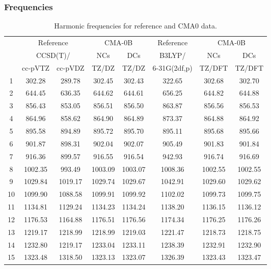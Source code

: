 \documentclass[10pt,oneside]{article}
\begin{document}
\clearpage

\subsubsection*{Frequencies}
\begin{table}[h!]
\centering
\caption{Harmonic frequencies for reference and CMA0 data.}
\begin{tabular}{cccccccc}
\toprule
{} & \multicolumn{2}{c}{Reference} & \multicolumn{2}{c}{CMA-0B} &    Reference & \multicolumn{2}{c}{CMA-0B} \\
{} & \multicolumn{2}{c}{CCSD(T)/} &     NCs &     DCs &       B3LYP/ &     NCs &     DCs \\
{} &   cc-pVTZ & cc-pVDZ &   TZ/DZ &   TZ/DZ & 6-31G(2df,p) &  TZ/DFT &  TZ/DFT \\
\midrule
1  &    302.28 &  289.78 &  302.45 &  302.43 &       322.65 &  302.68 &  302.70 \\
2  &    644.45 &  636.35 &  644.62 &  644.61 &       656.25 &  644.82 &  644.88 \\
3  &    856.43 &  853.05 &  856.51 &  856.50 &       863.87 &  856.56 &  856.53 \\
4  &    864.96 &  858.62 &  864.90 &  864.89 &       873.37 &  864.88 &  864.92 \\
5  &    895.58 &  894.89 &  895.72 &  895.70 &       895.11 &  895.68 &  895.66 \\
6  &    901.87 &  898.31 &  902.04 &  902.07 &       905.49 &  901.83 &  901.84 \\
7  &    916.36 &  899.57 &  916.55 &  916.54 &       942.93 &  916.74 &  916.69 \\
8  &   1002.35 &  993.49 & 1003.09 & 1003.07 &      1008.36 & 1002.55 & 1002.55 \\
9  &   1029.84 & 1019.17 & 1029.74 & 1029.67 &      1042.91 & 1029.60 & 1029.62 \\
10 &   1099.90 & 1088.58 & 1099.91 & 1099.92 &      1102.02 & 1099.73 & 1099.75 \\
11 &   1134.81 & 1129.24 & 1134.23 & 1134.24 &      1138.20 & 1136.15 & 1136.12 \\
12 &   1176.53 & 1164.88 & 1176.51 & 1176.56 &      1174.34 & 1176.25 & 1176.26 \\
13 &   1219.17 & 1218.99 & 1218.99 & 1219.03 &      1221.47 & 1218.73 & 1218.75 \\
14 &   1232.80 & 1219.17 & 1233.04 & 1233.11 &      1238.39 & 1232.91 & 1232.90 \\
15 &   1323.48 & 1318.50 & 1323.13 & 1323.07 &      1326.39 & 1323.43 & 1323.47 \\

\end{tabular}
\end{table}
\end{document}

